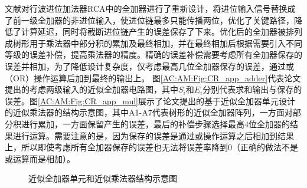 文献\cite{AC:AM:CR}对行波进位加法器RCA中的全加器进行了重新设计，将进位输入信号替换成了前一级全加器的非进位输入，使进位链最多只能传播两位，优化了关键路径，降低了计算延迟，同时将截断进位链产生的误差保存了下来。优化后的全加器被排列成树形用于乘法器中部分积的累加及最终相加，并在最终相加后根据需要引入不同等级的误差补偿，提高乘法器的精度。精确的误差补偿需要考虑所有全加器保存的误差并相加，为了降低设计复杂度，仅考虑最高几位全加器保存的误差，通过或（OR）操作运算后加到最终的输出上。
图\ref{AC:AM:Fig:CR_app_adder}代表论文提出的考虑两级输入的近似全加器电路图，其中$S_i$和$E_i$分别代表求和输出与保存的误差。图\ref{AC:AM:Fig:CR_app_mul}展示了论文提出的基于近似全加器单元设计的近似乘法器的结构示意图，其中A1-A7代表树形的近似全加器阵列，一方面对部分积进行累加，一方面保留产生的误差，最后的补偿步骤选择最高4位全加器的结果进行运算。需要注意的是，因为保存的误差是通过或操作运算之后相加到结果上，所以即使考虑所有全加器保存的误差也无法将误差率降到0（正确的做法不是或运算而是相加）。
\begin{figure}[!htb]
    \centering
\caption{近似全加器单元和近似乘法器结构示意图}
\end{figure}

